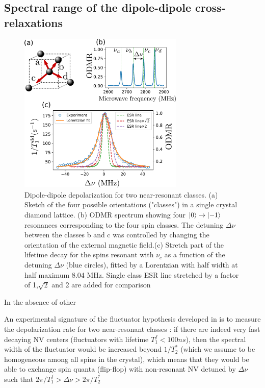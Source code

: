 \documentclass[preprintnumbers,amsmath,amssymb,onecolumn,12pt]{revtex4-2}
\begin{document}
\subsection{Spectral range of the dipole-dipole cross-relaxations}
\begin{figure}
\includegraphics[width=0.7\textwidth]{Figures_SI/largeur_fluct_SI}
\caption{Dipole-dipole depolarization for two near-resonant classes. (a) Sketch of the four possible orientations ("classes") in a single crystal diamond lattice. (b) ODMR spectrum showing four $\ket{0} \to \ket{-1}$ resonances corresponding to the four spin classes. The detuning $\Delta \nu$ between the classes b and c was controlled by changing the orientation of the external magnetic field.(c) Stretch part of the lifetime decay for the spins resonant with $\nu_c$ as a function of the detuning $\Delta \nu$ (blue circles), fitted by a Lorentzian with half width at half maximum 8.04 MHz. Single class ESR line stretched by a factor of 1,$\sqrt{2}$ and 2 are added for comparison}
\label{largeur_fluct}
\end{figure}
In the absence of other 

An experimental signature of the fluctuator hypothesis developed in \cite{choi_depolarization_2017} is to measure the depolarization rate for two near-resonant classes : if there are indeed very fast decaying NV centers (fluctuators with lifetime $T_1^f < 100 ns$), then the spectral width of the fluctuator would be increased beyond $1/T_2^*$ (which we assume to be homogeneous among all spins in the crystal), which means that they would be able to exchange spin quanta (flip-flop) with non-resonant NV detuned by $\Delta \nu$ such that $2\pi/T_1^f > \Delta \nu > 2\pi/T_2^*$
\end{document}

